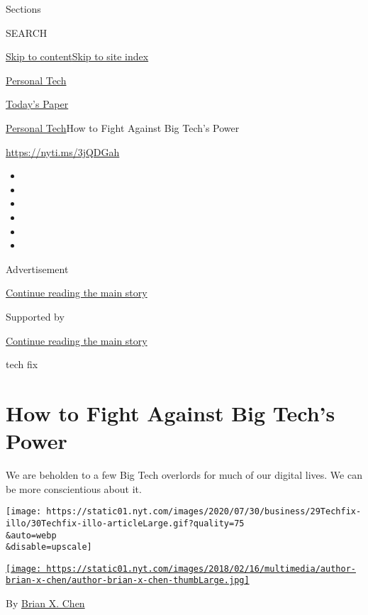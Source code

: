 Sections

SEARCH

\protect\hyperlink{site-content}{Skip to
content}\protect\hyperlink{site-index}{Skip to site index}

\href{https://www.nytimes.com/section/technology/personaltech}{Personal
Tech}

\href{https://myaccount.nytimes.com/auth/login?response_type=cookie\&client_id=vi}{}

\href{https://www.nytimes.com/section/todayspaper}{Today's Paper}

\href{/section/technology/personaltech}{Personal Tech}\textbar{}How to
Fight Against Big Tech's Power

\url{https://nyti.ms/3jQDGah}

\begin{itemize}
\item
\item
\item
\item
\item
\item
\end{itemize}

Advertisement

\protect\hyperlink{after-top}{Continue reading the main story}

Supported by

\protect\hyperlink{after-sponsor}{Continue reading the main story}

tech fix

\hypertarget{how-to-fight-against-big-techs-power}{%
\section{How to Fight Against Big Tech's
Power}\label{how-to-fight-against-big-techs-power}}

We are beholden to a few Big Tech overlords for much of our digital
lives. We can be more conscientious about it.

\texttt{[image: https://static01.nyt.com/images/2020/07/30/business/29Techfix-illo/30Techfix-illo-articleLarge.gif?quality=75\\\&auto=webp\\\&disable=upscale]}

\href{https://www.nytimes.com/by/brian-x-chen}{\texttt{[image: https://static01.nyt.com/images/2018/02/16/multimedia/author-brian-x-chen/author-brian-x-chen-thumbLarge.jpg]}}

By \href{https://www.nytimes.com/by/brian-x-chen}{Brian X. Chen}

